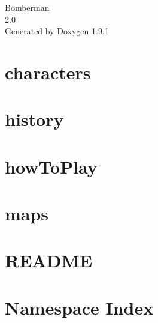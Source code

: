 \let\mypdfximage\pdfximage\def\pdfximage{\immediate\mypdfximage}\documentclass[twoside]{book}
\newcommand{\+}{\discretionary{\mbox{\scriptsize$\hookleftarrow$}}{}{}}
\newcommand{\clearemptydoublepage}{%
  \newpage{\pagestyle{empty}\cleardoublepage}%
}
\begin{document}
\raggedbottom

\hypersetup{pageanchor=false,
             bookmarksnumbered=true,
             pdfencoding=unicode
            }
\begin{titlepage}
\vspace*{7cm}
\begin{center}%
{\Large Bomberman \\[1ex]\large 2.\+0 }\\
\vspace*{1cm}
{\large Generated by Doxygen 1.9.1}\\
\end{center}
\end{titlepage}
\clearemptydoublepage
{}
\tableofcontents
\clearemptydoublepage
{}
\hypersetup{pageanchor=true}

\chapter{characters}
\label{md_characters}

\chapter{history}
\label{md_history}

\chapter{how\+To\+Play}
\label{md_how_to_play}

\chapter{maps}
\label{md_maps}

\chapter{README}
\label{md__c___users_jonat__documents__git_hub__b__y_e_p_400__l_y_n_4_1_indiestudio_lucas_guichard__r_e_a_d_m_e}

\chapter{Namespace Index}

\end{document}
